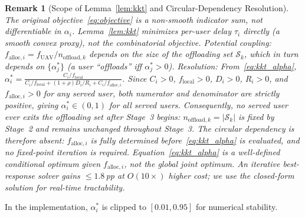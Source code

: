 \documentclass[journal]{IEEEtran}
\newtheorem{remark}{Remark}
\begin{document}
\begin{remark}[Scope of Lemma~\ref{lem:kkt} and Circular-Dependency Resolution]
\label{rem:circular}
The original objective~\eqref{eq:objective} is a non-smooth indicator sum, not differentiable in $\alpha_i$.
Lemma~\ref{lem:kkt} minimizes per-user delay $\tau_i$ directly (a smooth convex proxy), not the combinatorial objective.
\emph{Potential coupling:} $f_{\text{alloc},i} = f_{\text{UAV}}/n_{\text{offload},k}$ depends on the size of the offloading set $\mathcal{S}_k$, which in turn depends on $\{\alpha_j^*\}$ (a user ``offloads'' iff $\alpha_j^* > 0$).
\emph{Resolution:} From~\eqref{eq:kkt_alpha}, $\alpha_i^* = \frac{C_i/f_{\text{local}}}{C_i/f_{\text{local}} + (1+\rho)D_i/R_i + C_i/f_{\text{alloc},i}}$.
Since $C_i > 0$, $f_{\text{local}} > 0$, $D_i > 0$, $R_i > 0$, and $f_{\text{alloc},i} > 0$ for any served user, both numerator and denominator are strictly positive, giving $\alpha_i^* \in (0,1)$ for all served users.
Consequently, no served user ever exits the offloading set after Stage~3 begins: $n_{\text{offload},k} = |\mathcal{S}_k|$ is fixed by Stage~2 and remains unchanged throughout Stage~3.
The circular dependency is therefore absent: $f_{\text{alloc},i}$ is fully determined before~\eqref{eq:kkt_alpha} is evaluated, and no fixed-point iteration is required.
Equation~\eqref{eq:kkt_alpha} is a well-defined conditional optimum given $f_{\text{alloc},i}$, not the global joint optimum.
An iterative best-response solver gains $\leq 1.8$\,pp at $O(10\times)$ higher cost; we use the closed-form solution for real-time tractability.
\end{remark}

In the implementation, $\alpha_i^*$ is clipped to $[0.01, 0.95]$ for numerical stability.
\end{document}
